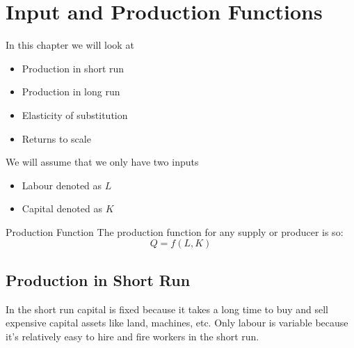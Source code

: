 \documentclass[../ECON-281-Notes.tex]{subfiles}
\begin{document}
\chapter{Input and Production Functions}
In this chapter we will look at 
\begin{itemize}
    \item Production in short run 
    \item Production in long run 
    \item Elasticity of substitution 
    \item Returns to scale
\end{itemize}

We will assume that we only have two inputs
\begin{itemize}
    \item Labour denoted as $L$
    \item Capital denoted as $K$
\end{itemize}
\begin{Definition}
    {Production Function}
    The production function for any supply or producer is so:
    \begin{equation}
        Q = f(L, K)
    \end{equation}
\end{Definition}

\section{Production in Short Run}
In the short run capital is fixed because it takes a long time to buy and sell expensive capital assets like land, machines, etc.
Only labour is variable because it's relatively easy to hire and fire workers in the short run. 
\end{document}
